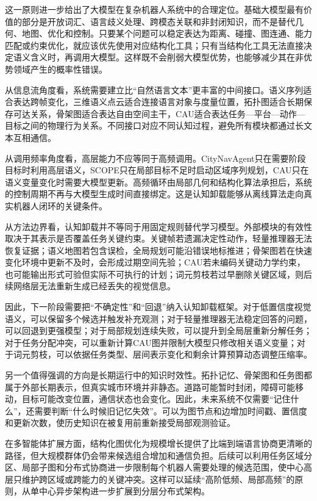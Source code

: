 这一原则进一步给出了大模型在复杂机器人系统中的合理定位。基础大模型最有价值的部分是开放词汇、语言歧义处理、跨模态关联和非封闭知识，而不是替代几何、地图、优化和控制。只要某个问题可以稳定表达为距离、碰撞、图连通、能力匹配或约束优化，就应该优先使用对应结构化工具；只有当结构化工具无法直接决定语义含义时，再调用大模型。这样既不会削弱大模型优势，也能够减少其在非优势领域产生的概率性错误。

从信息流角度看，系统需要建立比“自然语言文本”更丰富的中间接口。语义序列适合表达跨帧变化，三维语义点云适合连接语言对象与度量位置，拓扑图适合长期保存可达关系，骨架图适合表达自由空间主干，CAU适合表达任务—平台—动作—目标之间的物理行为关系。不同接口对应不同认知过程，避免所有模块都通过长文本互相通信。

从调用频率角度看，高层能力不应等同于高频调用。CityNavAgent只在需要阶段目标时利用高层语义，SCOPE只在局部目标不足时启动区域序列规划，CAU只在语义变量变化时需要大模型更新。高频循环由局部几何和结构化算法承担后，系统的控制周期不再与大模型生成时间直接绑定。这是认知卸载能够从离线算法走向真实机器人闭环的关键条件。

从方法边界看，认知卸载并不等同于用固定规则替代学习模型。外部模块的有效性取决于其表示是否覆盖任务关键约束。关键帧若遗漏决定性动作，轻量推理器无法恢复证据；语义地图若包含误检，全局规划可能沿错误地标推进；骨架图若在快速变化环境中更新不及时，会形成过期空间先验；CAU若未编码关键动力学约束，也可能输出形式可验但实际不可执行的计划；词元剪枝若过早删除关键区域，则后续网络层无法重新生成已经丢失的视觉信息。

因此，下一阶段需要把“不确定性”和“回退”纳入认知卸载框架。对于低置信度视觉语义，可以保留多个候选并触发补充观测；对于轻量推理器无法稳定回答的问题，可以回退到更强模型；对于局部规划连续失败，可以提升到全局层重新分解任务；对于任务分配冲突，可以重新计算CAU图并限制大模型只修改相关语义变量；对于词元剪枝，可以依据任务类型、层间表示变化和剩余计算预算动态调整压缩率。

另一个值得强调的方向是长期运行中的知识时效性。拓扑记忆、骨架图和任务图都属于外部长期表示，但真实城市环境并非静态。道路可能暂时封闭，障碍可能移动，目标可能改变位置，通信状态也会变化。因此，未来系统不仅需要“记住什么”，还需要判断“什么时候旧记忆失效”。可以为图节点和边增加时间戳、置信度和更新次数，使历史知识在被复用前重新接受局部观测验证。

在多智能体扩展方面，结构化图优化为规模增长提供了比端到端语言协商更清晰的路径，但大规模群体仍会带来候选组合增加和通信负担。后续可以利用任务区域分区、局部子图和分布式协商进一步限制每个机器人需要处理的候选范围，使中心高层只维护跨区域或跨能力的关键冲突。这样可以延续“高阶低频、局部高频”的原则，从单中心异步架构进一步扩展到分层分布式架构。

